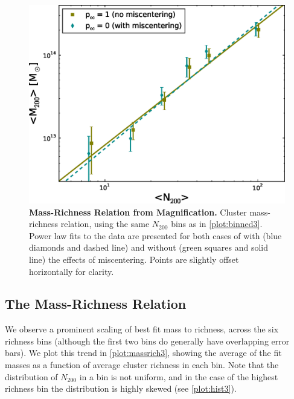 \begin{figure}
\begin{center}
\includegraphics[scale=0.7]{plots_ch3/MassRich_2to1000_U.eps}
\caption[Mass-Richness Relation from Magnification]{{\bf Mass-Richness Relation from Magnification.} Cluster mass-richness relation, using the same $N_{200}$ bins as in \autoref{plot:binned3}. Power law fits to the data are presented for both cases of with (blue diamonds and dashed line) and without (green squares and solid line) the effects of miscentering. Points are slightly offset horizontally for clarity.}
\label{plot:massrich3}
\end{center}
\end{figure}

\subsection{The Mass-Richness Relation}

We observe a prominent scaling of best fit mass to richness, across the six richness bins (although the first two bins do generally have overlapping error bars). We plot this trend in \autoref{plot:massrich3}, showing the average of the fit masses as a function of average cluster richness in each bin. Note that the distribution of $N_{200}$ in a bin is not uniform, and in the case of the highest richness bin the distribution is highly skewed (see \autoref{plot:hist3}).

